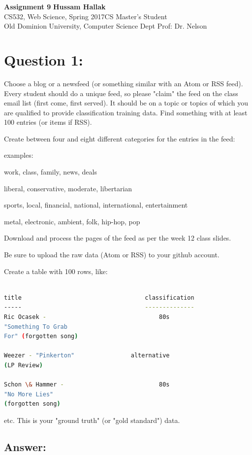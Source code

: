 \documentclass[a4paper, 11pt]{article}
\begin{document}
\noindent
\large\textbf{Assignment 9} \hfill \textbf{Hussam Hallak} \\
\normalsize CS532, Web Science, Spring 2017\hfill CS Master's Student \\
Old Dominion University, Computer Science Dept \hfill Prof: Dr. Nelson 

\section*{Question 1:}
Choose a blog or a newsfeed (or something similar with an Atom
or RSS feed).  Every student should do a unique feed, so please
"claim" the feed on the class email list (first come, first served).
It should be on a topic or topics of which you are qualified to
provide classification training data.  Find something with at least
100 entries (or items if RSS).

Create between four and eight different categories for the entries
in the feed:

examples: 

work, class, family, news, deals

liberal, conservative, moderate, libertarian

sports, local, financial, national, international, entertainment

metal, electronic, ambient, folk, hip-hop, pop

Download and process the pages of the feed as per the week 12 
class slides.

Be sure to upload the raw data (Atom or RSS) to your github account.

Create a table with 100 rows, like:

\begin{lstlisting}[language=bash,label=Command:, breakatwhitespace=〈false), caption=Command:]

title									classification
-----									--------------
Ric Ocasek -								80s 
"Something To Grab 
For" (forgotten song)	

Weezer - "Pinkerton" 				alternative
(LP Review)

Schon \& Hammer - 							80s
"No More Lies" 
(forgotten song)

\end{lstlisting}

etc.  This is your "ground truth" (or "gold standard") data.


\subsection*{Answer:}
\end{document}
